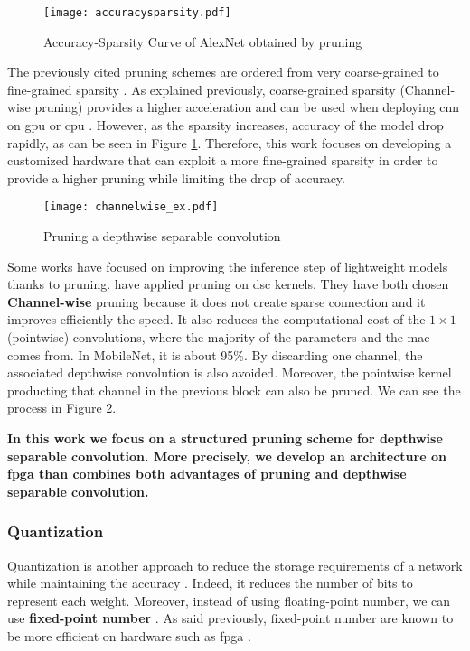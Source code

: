 \begin{figure}
    \centering
    \texttt{[image: accuracysparsity.pdf]}
    \caption{Accuracy-Sparsity Curve of AlexNet obtained by pruning \cite{mao_exploring_2017}}
    \label{fig:pruning-accuracy}
\end{figure}
%
The previously cited pruning schemes are ordered from very coarse-grained to fine-grained sparsity \cite{mao_exploring_2017}. As explained previously, coarse-grained sparsity (Channel-wise pruning) provides a higher acceleration and can be used when deploying \acrshort{cnn} on \acrshort{gpu} or \acrshort{cpu} \cite{mao_exploring_2017, cheng_recent_2018}. However, as the sparsity increases, accuracy of the model drop rapidly, as can be seen in Figure \ref{fig:pruning-accuracy}. Therefore, this work focuses on developing a customized hardware that can exploit a more fine-grained sparsity \cite{mao_exploring_2017} in order to provide a higher pruning while limiting the drop of accuracy.

%
\begin{figure}
    \centering
    \texttt{[image: channelwise\_ex.pdf]}
    \caption{Pruning a depthwise separable convolution \cite{tu_pruning_2019}}
    \label{fig:pruning_dsc}
\end{figure}
Some works have focused on improving the inference step of lightweight models thanks to pruning. \textcite{zhang_channel_2019, tu_pruning_2019} have applied pruning on \acrshort{dsc} kernels. They have both chosen \textbf{Channel-wise} pruning because it does not create sparse connection and it improves efficiently the speed. It also reduces the computational cost of the $1 \times 1$ (pointwise) convolutions, where the majority of the parameters and the \acrshort{mac} comes from. In MobileNet, it is about 95\%. By discarding one channel, the associated depthwise convolution is also avoided.
Moreover, the pointwise kernel producting that channel in the previous block can also be pruned. We can see the process in Figure \ref{fig:pruning_dsc}.

\textbf{In this work we focus on a structured pruning scheme for depthwise separable convolution. More precisely, we develop an architecture on \acrshort{fpga} than combines both advantages of pruning and depthwise separable convolution.}
%
%
\subsubsection{Quantization} \label{subs:quantization}
Quantization is another approach to reduce the storage requirements of a network while maintaining the accuracy \cite{han_deep_2016}. Indeed, it reduces the number of bits to represent each weight. Moreover, instead of using floating-point number, we can use \textbf{fixed-point number} \cite{cheng_recent_2018}. As said previously, fixed-point number are known to be more efficient on hardware such as \acrshort{fpga} \cite{david_hardware_2007}.

